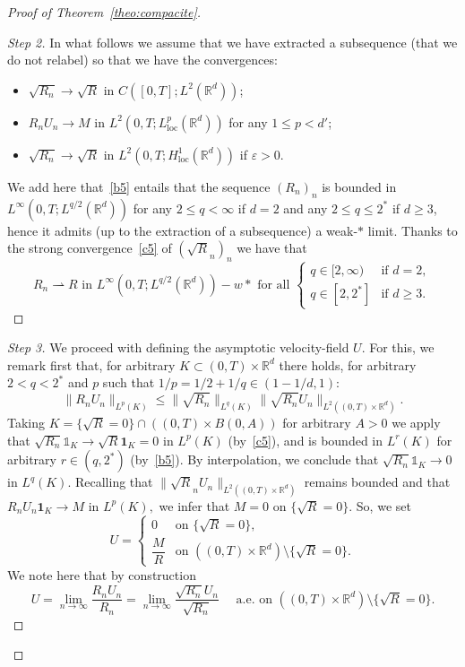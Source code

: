 \documentclass[AHL,Unicode,longabstracts]{cedram}
\newcommand*{\un}{\mathds{1}}
\newcommand*{\loc}{\mathrm{loc}}
\newcommand*\<{\left\langle}
\renewcommand*\>{\right\rangle}
\renewcommand*\le{\leqslant}
\renewcommand*\ge{\geqslant}
\newcommand*\eps{\varepsilon}
\begin{document}
\begin{proof}[Proof of Theorem~\ref{theo:compacite}]
\begin{proof}[Step 2]
\goodbreak
In what follows we assume that we have extracted a subsequence (that we do not relabel) so that we have the convergences:
\begin{itemize}
\item $\sqrt{R_n} \to \sqrt{R}$ in $C([0,T];L^2(\mathbb R^d))$;
\item $R_n U_n \to M$ in $L^2(0,T;L^p_{\loc}(\mathbb R^d))$ for any $1 \le p < d'$;
\item $\sqrt{R_n} \to \sqrt{R}$ in $L^2(0,T;H^{1}_{\loc}(\mathbb R^d))$ if $\eps > 0$.
\end{itemize}
We add here that~\eqref{b5} entails that the sequence $(R_n)_{n}$ is bounded in\linebreak $L^{\infty}(0,T;L^{q/2}(\mathbb R^d))$ for any $2\le q < \infty$ if $d=2$ and any $2 \le q \le 2^*$ if $d \ge 3$, hence it admits (up to the extraction of a subsequence) a weak-$*$ limit. Thanks to the strong convergence~\eqref{c5} of $(\sqrt{R}_n)_n$ we have that
\begin{equation*}\label{eq_cvgcdensity}
\tag{c7}
R_n \rightharpoonup R \text{ in $L^{\infty}(0,T;L^{q/2}(\mathbb R^d))-w*$ for all }
\begin{cases}
q \in [2,\infty) &\text{if } d = 2, \\
q \in [2,2^*] &\text{if } d \ge 3.
\end{cases}
\end{equation*}
\let\qed\relax
\end{proof}

\begin{proof}[Step 3]
We proceed with defining the asymptotic velocity-field $U.$ For this, we remark first that, for arbitrary $K\subset (0,T) \times \mathbb R^d$ there holds, for arbitrary $ 2 < q <2^*$ and $p$ such that $1/p= 1/2 + 1/q \in (1 - 1/d,1):$
\[
\|R_n U_n\|_{L^p(K)} \le \|\sqrt{R_n}\|_{L^{q}(K)} \|\sqrt{R_n} U_n\|_{L^2((0,T) \times \mathbb R^d)}.
\]
Taking $K = \{\sqrt{R} =0\} \cap \left((0,T) \times B(0,A)\right)$ for arbitrary $A >0$ we apply that $\sqrt{R_n} \un_{K} \to \sqrt R \mathbf 1_K = 0$ in $L^p(K)$ (by~\eqref{c5}), and is bounded in $L^{r}(K)$ for arbitrary $r \in (q,2^*)$ (by~\eqref{b5}). By interpolation, we conclude that $\sqrt{R_n} \un_{K} \to 0$ in $L^q(K).$ Recalling that $\|\sqrt{R}_n U_n\|_{L^2((0,T) \times \mathbb R^d)}$ remains bounded and that $R_n U_n \mathbf 1_{K} \to M$ in $L^p(K),$ we infer that $M = 0$ on $\{\sqrt{R}=0\}.$ So, we set
\[
U=\begin{cases}
0 & \text{on }\{\sqrt{R} = 0\},\\
\dfrac{M}{R} & \text{on }\left((0,T) \times \mathbb R^d\right) \setminus \{\sqrt{R} = 0\}.
\end{cases}
\]
We note here that by construction
\[
U = \lim_{n \to \infty} \dfrac{R_n U_n}{R_n} = \lim_{n \to \infty}
\dfrac{\sqrt{R_n} U_n}{\sqrt{R_n}} \quad \text{ a.e. on $\left((0,T)
\times \mathbb R^d\right) \setminus \{\sqrt{R} = 0\}$}.
\]


\end{proof}
\end{proof}
\end{document}
